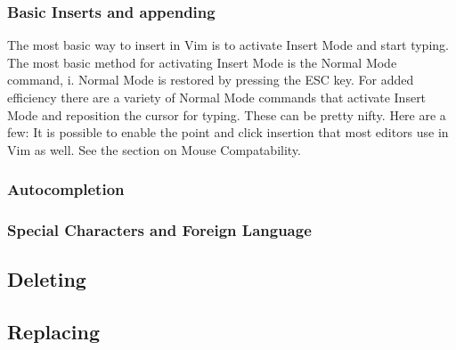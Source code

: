\documentclass[12pt, oneside]{book}
\begin{document}
    \subsubsection{Basic Inserts and appending}
The most basic way to insert in Vim is to activate Insert Mode and start typing.  The most basic method for activating Insert Mode is the Normal Mode command, i.  Normal Mode is restored by pressing
the ESC key.  For added efficiency there are a variety of Normal Mode commands that activate Insert Mode and reposition the cursor for typing.  These can be pretty nifty.  Here are a few:
It is possible to enable the point and click insertion that most editors use in Vim as well.  See the section on Mouse Compatability.
    \subsubsection{Autocompletion}
    \subsubsection{Special Characters and Foreign Language}
  \subsection{Deleting}
  \subsection{Replacing}
\end{document}
